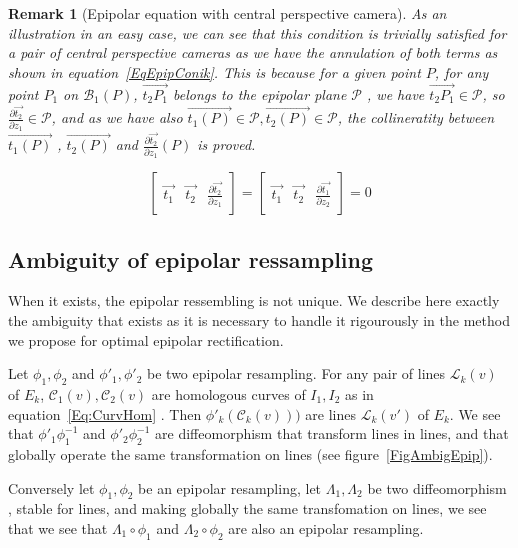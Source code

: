 \documentclass[a4paper]{article}
\newcommand{\Bund}[1]{\ensuremath{\mathcal{B}_{#1}}}
\newcommand{\BundO}{\Bund{1}}
\newcommand{\LineE}[1]{\ensuremath{\mathcal{L}_{#1}}}
\newcommand{\LineK}{\LineE{k}}
\newcommand{\CurveE}[1]{\ensuremath{\mathcal{C}_{#1}}}
\newcommand{\CurveO}{\CurveE{1}}
\newcommand{\CurveT}{\CurveE{2}}
\newcommand{\CurveK}{\CurveE{k}}
\newcommand{\BigV}[1]{\ensuremath{\overrightarrow{#1}}}
\newcommand{\TanO}[1]{\BigV{t_1#1}}
\newcommand{\TanT}[1]{\BigV{t_2#1}}
\newcommand{\DerPart}[2]{\frac{\partial #1}{\partial #2}}
\newtheorem{remark}{Remark}
\begin{document}
\begin{remark}[Epipolar equation with central perspective camera]
As an illustration in an easy case, we can see that this condition is trivially 
satisfied for a pair of central perspective cameras as we have the annulation of both terms as shown
in equation~\ref{EqEpipConik}. This is because for a given point $P$,
for any point $P_1$ on $\BundO(P)$, $\TanT{P_1}$ belongs to the epipolar
plane $\mathcal{P}$ , we have $\TanT{P_1} \in \mathcal{P}$, so $\DerPart { \TanT{}}{z_1} \in \mathcal{P}$,
and as we have also $\TanO{(P)} \in  \mathcal{P}, \TanT{(P)} \in  \mathcal{P}$, the collineratity
between $\TanO{(P)}$ , $\TanT{(P)}$ and $\DerPart { \TanT{}}{z_1}(P)$ is proved.

\begin{equation}
\left[ \begin{array}{c|c|c}
\TanO{} & \TanT{}  & \DerPart { \TanT{}}{z_1}  
\end{array} \right]  
=\left[ \begin{array}{c|c|c}
\TanO{} & \TanT{}  & \DerPart { \TanO{}}{z_2}  
\end{array} \right]  
=0
\label{EqEpipConik}
\end{equation}
\end{remark}





\subsection{Ambiguity of epipolar ressampling}

When it exists, the epipolar ressembling is not unique.  We
describe here exactly the ambiguity that exists as it is necessary
to handle it rigourously in the method we propose for optimal epipolar rectification.

Let $\phi_1,\phi_2$ and  $\phi'_1,\phi'_2$ be two   epipolar resampling.
For any pair of lines $\LineK(v)$ of $E_k$, 
$\CurveO(v),\CurveT(v)$  are homologous curves of 
$I_1,I_2$ as in equation~\ref{Eq:CurvHom} .  Then $\phi'_k(\CurveK(v)))$
are   lines $\LineK(v')$ of $E_k$.
We see that $\phi'_1 \phi_1^{-1}$  and $\phi'_2 \phi_2^{-1}$ are diffeomorphism
that transform lines in lines, and that globally operate the same transformation
on lines (see figure~\ref{FigAmbigEpip}).

Conversely let   $\phi_1,\phi_2$ be an epipolar resampling, let $\Lambda_1,\Lambda_2$ 
be two diffeomorphism , stable for lines, and making globally the same transfomation on lines, we see that 
we see that $\Lambda_1 \circ \phi_1$ and  $\Lambda_2 \circ \phi_2$ are also an epipolar resampling.
\end{document}
